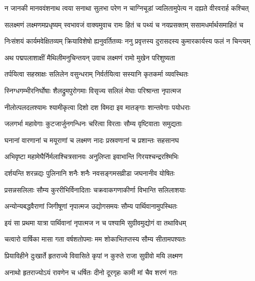 \fourlineindentedshloka
{न जानकी मानववंशनाथ}
{त्वया सनाथा सुलभा परेण}
{न चाग्निचूडां ज्वलितामुपेत्य}
{न दह्यते वीरवरार्ह कश्चित्} %

\fourlineindentedshloka
{सलक्ष्मणं लक्ष्मणमप्रधृष्यम्}
{स्वभावजं वाक्यमुवाच रामः}
{हितं च पथ्यं च नयप्रसक्तम्}
{ससामधर्मार्थसमाहितं च} %

\fourlineindentedshloka
{निःसंशयं कार्यमवेक्षितव्यम्}
{क्रियाविशेषो ह्यनुवर्तितव्यः}
{ननु प्रवृत्तस्य दुरासदस्य}
{कुमारकार्यस्य फलं न चिन्त्यम्} %

\twolineshloka
{अथ पद्मपलाशाक्षीं मैथिलीमनुचिन्तयन्}
{उवाच लक्ष्मणं रामो मुखेन परिशुष्यता} %

\twolineshloka
{तर्पयित्वा सहस्राक्षः सलिलेन वसुन्धराम्}
{निर्वर्तयित्वा सस्यानि कृतकर्मा व्यवस्थितः} %

\twolineshloka
{स्निग्धगम्भीरनिर्घोषाः शैलद्रुमपुरोगमाः}
{विसृज्य सलिलं मेघाः परिश्रान्ता नृपात्मज} %

\twolineshloka
{नीलोत्पलदलश्यामः श्यामीकृत्वा दिशो दश}
{विमदा इव मातङ्गाः शान्तवेगाः पयोधराः} %

\twolineshloka
{जलगर्भा महावेगाः कुटजार्जुनगन्धिनः}
{चरित्वा विरताः सौम्य वृष्टिवाताः समुद्यताः} %

\twolineshloka
{घनानां वारणानां च मयूराणां च लक्ष्मण}
{नादः प्रस्रवणानां च प्रशान्तः सहसानघ} %

\twolineshloka
{अभिवृष्टा महामेघैर्निर्मलाश्चित्रसानवः}
{अनुलिप्ता इवाभान्ति गिरयश्चन्द्ररश्मिभिः} %

\twolineshloka
{दर्शयन्ति शरन्नद्यः पुलिनानि शनैः शनैः}
{नवसङ्गमसव्रीडा जघनानीव योषितः} %

\twolineshloka
{प्रसन्नसलिलाः सौम्य कुररीभिर्विनादिताः}
{चक्रवाकगणाकीर्णा विभान्ति सलिलाशयाः} %

\twolineshloka
{अन्योन्यबद्धवैराणां जिगीषूणां नृपात्मज}
{उद्योगसमयः सौम्य पार्थिवानामुपस्थितः} %

\twolineshloka
{इयं सा प्रथमा यात्रा पार्थिवानां नृपात्मज}
{न च पश्यामि सुग्रीवमुद्योगं वा तथाविधम्} %

\twolineshloka
{चत्वारो वार्षिका मासा गता वर्षशतोपमाः}
{मम शोकाभितप्तस्य सौम्य सीतामपश्यतः} %

\twolineshloka
{प्रियाविहीने दुःखार्ते हृतराज्ये विवासिते}
{कृपां न कुरुते राजा सुग्रीवो मयि लक्ष्मण} %

\twolineshloka
{अनाथो हृतराज्योऽयं रावणेन च धर्षितः}
{दीनो दूरगृहः कामी मां चैव शरणं गतः} %

